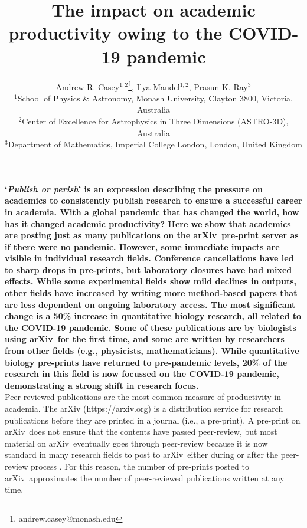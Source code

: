 \documentclass[a4paper,12pt]{article}
\title{The impact on academic productivity owing to the COVID-19 pandemic}
\author{Andrew R. Casey$^{1,2}$\footnote{andrew.casey@monash.edu},
        Ilya Mandel$^{1,2}$,
        Prasun K. Ray$^{3}$\\
\normalsize{$^{1}$School of Physics \& Astronomy, Monash University, Clayton 3800, Victoria, Australia}\\
\normalsize{$^{2}$Center of Excellence for Astrophysics in Three Dimensions (ASTRO-3D), Australia}\\
\normalsize{$^{3}$Department of Mathematics, Imperial College London, London, United Kingdom}
}
\date{}
\newcommand{\arxiv}{arXiv}
\begin{document}
\newpage
\setcounter{page}{1}
\resetlinenumber[1]

\maketitle


\noindent \textbf{`\emph{Publish or perish}' is an expression describing the pressure on academics to consistently publish research to ensure a successful career in academia. 
With a global pandemic that has changed the world, how has it changed academic productivity? 
Here we show that academics are posting just as many publications on the \arxiv\ pre-print server as if there were no pandemic.
However, some immediate impacts are visible in individual research fields.
Conference cancellations have led to sharp drops in pre-prints, but laboratory closures have had mixed effects.
While some experimental fields show mild declines in outputs, other fields have increased by writing more method-based papers that are less dependent on ongoing laboratory access.
The most significant change is a 50\% increase in quantitative biology research, all related to the COVID-19 pandemic.
Some of these publications are by biologists using \arxiv\ for the first time, and some are written by researchers from other fields (e.g., physicists, mathematicians).
While quantitative biology pre-prints have returned to pre-pandemic levels, 20\% of the research in this field is now focussed on the COVID-19 pandemic, demonstrating a strong shift in research focus.
}\\

\noindent Peer-reviewed publications are the most common measure of productivity in academia. The \arxiv\cite{Ginsparg:2011} ({https://arxiv.org}) is a distribution service for research publications before they are printed in a journal (i.e., a pre-print). A pre-print on \arxiv\ does not ensure that the contents have passed peer-review, but most material on \arxiv\ eventually goes through peer-review because it is now standard in many research fields to post to \arxiv\ either during or after the peer-review process \cite{Lariviere:2014}. For this reason, the number of pre-prints posted to \arxiv\ approximates the number of peer-reviewed publications written at any time.
\end{document}

